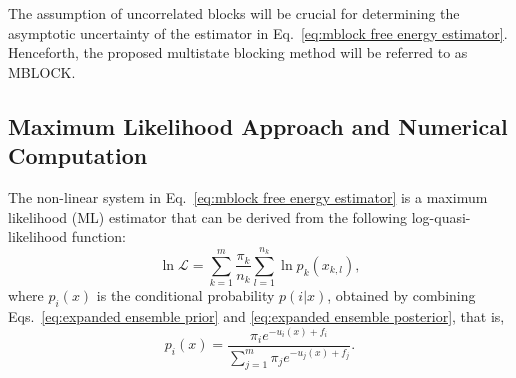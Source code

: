 \documentclass[aip,jcp,reprint,amsmath,amssymb]{revtex4-1}
\begin{document}
The assumption of uncorrelated blocks will be crucial for determining the asymptotic uncertainty of the estimator in Eq.~\eqref{eq:mblock free energy estimator}. Henceforth, the proposed multistate blocking method will be referred to as MBLOCK.

\subsection{Maximum Likelihood Approach and Numerical Computation}

The non-linear system in Eq.~\eqref{eq:mblock free energy estimator} is a maximum likelihood (ML) estimator that can be derived from the following log-quasi-likelihood function:\cite{Doss_2014, Tan_2015, Roy_2018}
\begin{equation}
\label{eq:mblock log-quasi-likelihood}
\ln \mathcal L = \sum_{k=1}^m \frac{\pi_k}{n_k} \sum_{l=1}^{n_k} \ln p_k(x_{k,l}),
\end{equation}
where $p_i(x)$ is the conditional probability $p(i|x)$, obtained by combining Eqs.~\eqref{eq:expanded ensemble prior} and \eqref{eq:expanded ensemble posterior}, that is,
\begin{equation}
\label{eq:mixture posterior probability}
p_i(x) = \frac{\pi_i e^{-u_i(x) + f_i}}{\sum_{j=1}^m \pi_j e^{-u_j(x) + f_j}}.
\end{equation}
\end{document}
